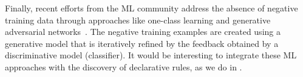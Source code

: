 Finally, recent efforts from the ML community address the absence of negative training data through approaches like one-class learning and generative adversarial networks~\cite{goodfellow2014generative}. The negative training examples are created using a generative model that is iteratively refined by the feedback obtained by a discriminative model (classifier). 
It would be interesting to integrate these ML approaches with the discovery of declarative rules, as we do in \krd.





